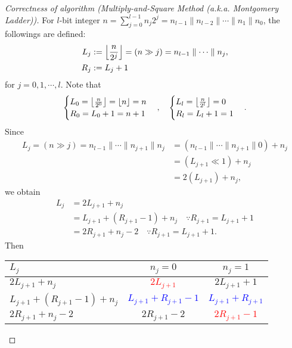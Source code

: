 \documentclass[12pt,openany]{book}
\DeclarePairedDelimiter{\floor}{\lfloor}{\rfloor}
\theoremstyle{definition}
\newcommand{\of}[1]{\left( #1 \right)}
\begin{document}
	\begin{proof}[Correctness of algorithm \textnormal{(Multiply-and-Square Method (a.k.a. Montgomery Ladder))}]	
		For $l$-bit integer $n=\sum_{j=0}^{l-1}n_j2^j=n_{l-1}\parallel n_{l-2}\parallel\cdots\parallel n_{1}\parallel n_0$, the followings are defined: \begin{align*}
			L_j&:=\floor*{\frac{n}{2^j}}=\of{n\gg j}=n_{l-1}\parallel\cdots\parallel n_j,\\
			R_j&:=L_j+1
		\end{align*} for $j=0,1,\cdots, l$. Note that \begin{align*}
			\begin{cases}
				L_0=\floor*{\frac{n}{2^0}}=\floor*{n}=n\\
				R_0=L_0+1=n+1
			\end{cases},\quad
			\begin{cases}
				L_l=\floor*{\frac{n}{2^l}}=0\\
				R_l=L_l+1=1
			\end{cases}.
		\end{align*} Since \begin{align*}
			L_j=(n\gg j)=n_{l-1}\parallel\cdots\parallel n_{j+1}\parallel n_j&=\of{n_{l-1}\parallel\cdots\parallel n_{j+1}\parallel 0} +n_j\\
			&=\of{L_{j+1}\ll 1}+n_j\\
			&=2\of{L_{j+1}}+n_j,
		\end{align*} we obtain \begin{align*}
			L_j&=2L_{j+1}+n_j\\
			&=L_{j+1}+\of{R_{j+1}-1}+n_j\quad\because R_{j+1}=L_{j+1}+1\\
			&=2{R_{j+1}}+n_j-2\quad\because R_{j+1}=L_{j+1}+1.
		\end{align*} Then \begin{center}
			\begin{tabular}{l||c|c}
				\toprule[1.2pt]
				$L_j$ & $n_j=0$ & $n_j=1$\\
				\midrule
				$2L_{j+1}+n_j$ & \textcolor{red}{$2L_{j+1}$} & $2L_{j+1}+1$\\
				\hline
				$L_{j+1}+\of{R_{j+1}-1}+n_j$ & \textcolor{blue}{$L_{j+1}+R_{j+1}-1$} & \textcolor{blue}{$L_{j+1}+R_{j+1}$}\\
				\hline
				$2{R_{j+1}}+n_j-2$ & $2{R_{j+1}}-2$ & \textcolor{red}{$2{R_{j+1}}-1$}\\
				\bottomrule[1.2pt]
			\end{tabular}
		\end{center}

\end{proof}
\end{document}
